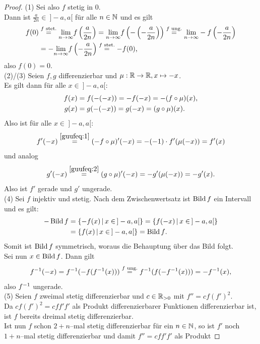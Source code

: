 \begin{proof}
(1) Sei also $f$ stetig in $0$.\\
Dann ist $\frac a {2n} \in\!\  ]-a,a[$ für alle $n \in \mathbb{N}$ und es gilt
\begin{align*}f(0) &\overset{f \text{ stet.}}
= \underset{n\to \infty}{\lim} f\left(\frac a {2n}\right) 
= \underset{n\to \infty}{\lim} f\left(-\left(-\frac a {2n}\right)\right)
\overset{f \text{ ung.}}= \underset{n\to \infty}{\lim} - f\left(-\frac a {2n}\right)\\ 
&= - \underset{n\to \infty}{\lim} f\left(-\frac a {2n}\right)
\overset{f \text{ stet.}}= - f(0)\text,
\end{align*}
also $f(0)=0$.\\
(2)/(3) Seien $f,g$ differenzierbar und $\mu:\mathbb{R}\to\mathbb{R}, x\mapsto-x$.\\
Es gilt dann für alle $x \in \!\ ]-a,a[$:
\begin{align}
\label{guufeq:1}f(x) &= f(-(-x)) = - f(-x) = - (f\circ \mu)(x)\text, \\
\label{guufeq:2}g(x) &= g(-(-x)) = g(-x) = (g \circ \mu)(x)\text. 
\end{align}
Also ist für alle $x \in \!\ ]-a,a[$:
\[f'(-x) \overset{\eqref{guufeq:1}}= 
(-f \circ \mu)'(-x) = - (-1)\cdot f'(\mu(-x))= f'(x)\]
und analog
\[g'(-x) \overset{\eqref{guufeq:2}}= 
(g \circ \mu)'(-x) = - g'(\mu(-x)) = -g'(x)\text.\]
Also ist $f'$ gerade und $g'$ ungerade.\\
(4) Sei $f$ injektiv und stetig. Nach dem Zwischenwertsatz ist $\mathop{\textrm{Bild}}\nolimits f$
ein Intervall und es gilt:
\begin{align*}
-\Bild f &= \menge{-f(x)}{x \in \!\ ]-a,a[}=\menge{f(-x)}{x \in \!\ ]-a,a[}\\
&= \menge{f(x)}{x \in \!\ ]-a,a[}= \Bild f\text.\end{align*}
Somit ist $\mathop{\textrm{Bild}}\nolimits f$ symmetrisch, woraus die Behauptung über das Bild folgt.\\
Sei nun $x \in \mathop{\textrm{Bild}}\nolimits f$. Dann gilt
\[f^{-1}(-x) = f^{-1}(-f(f^{-1}(x))) \overset{f \text{ ung.}} = 
f^{-1}(f(-f^{-1}(x))) = -f^{-1}(x)\text,\]
also $f^{-1}$ ungerade.\\
(5) Seien $f$ zweimal stetig differenzierbar und $c \in \mathbb{R}_{>0}$ mit
$f'' = cf(f')^2$.\\
Da $cf(f')^2 = cff'f'$ als Produkt differenzierbarer Funktionen differenzierbar
ist, ist $f$ bereits dreimal stetig differenzierbar.\\
Ist nun $f$ schon $2+n$--mal stetig differenzierbar für ein $n \in\mathbb{N}$, so ist
$f'$ noch $1+n$--mal stetig differenzierbar und damit $f''= cff'f'$ als Produkt

\end{proof}
